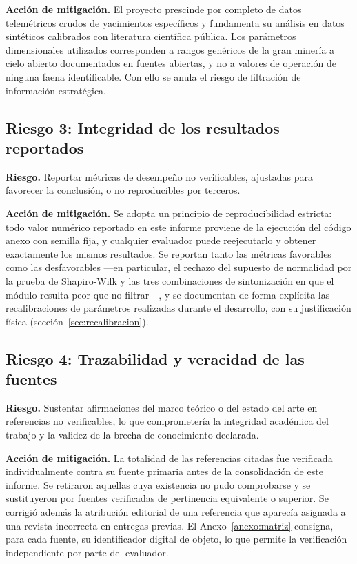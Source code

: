 \textbf{Acción de mitigación.} El proyecto prescinde por completo de datos
telemétricos crudos de yacimientos específicos y fundamenta su análisis en datos
sintéticos calibrados con literatura científica pública. Los parámetros
dimensionales utilizados corresponden a rangos genéricos de la gran minería a
cielo abierto documentados en fuentes abiertas, y no a valores de operación de
ninguna faena identificable. Con ello se anula el riesgo de filtración de
información estratégica.

\subsection{Riesgo 3: Integridad de los resultados reportados}

\textbf{Riesgo.} Reportar métricas de desempeño no verificables, ajustadas para
favorecer la conclusión, o no reproducibles por terceros.

\textbf{Acción de mitigación.} Se adopta un principio de reproducibilidad
estricta: todo valor numérico reportado en este informe proviene de la ejecución
del código anexo con semilla fija, y cualquier evaluador puede reejecutarlo y
obtener exactamente los mismos resultados. Se reportan tanto las métricas
favorables como las desfavorables —en particular, el rechazo del supuesto de
normalidad por la prueba de Shapiro-Wilk y las tres combinaciones de
sintonización en que el módulo resulta peor que no filtrar—, y se documentan de
forma explícita las recalibraciones de parámetros realizadas durante el
desarrollo, con su justificación física (sección~\ref{sec:recalibracion}).

\subsection{Riesgo 4: Trazabilidad y veracidad de las fuentes}

\textbf{Riesgo.} Sustentar afirmaciones del marco teórico o del estado del arte
en referencias no verificables, lo que comprometería la integridad académica del
trabajo y la validez de la brecha de conocimiento declarada.

\textbf{Acción de mitigación.} La totalidad de las referencias citadas fue
verificada individualmente contra su fuente primaria antes de la consolidación
de este informe. Se retiraron aquellas cuya existencia no pudo comprobarse y se
sustituyeron por fuentes verificadas de pertinencia equivalente o superior. Se
corrigió además la atribución editorial de una referencia que aparecía asignada
a una revista incorrecta en entregas previas. El Anexo~\ref{anexo:matriz}
consigna, para cada fuente, su identificador digital de objeto, lo que permite
la verificación independiente por parte del evaluador.

